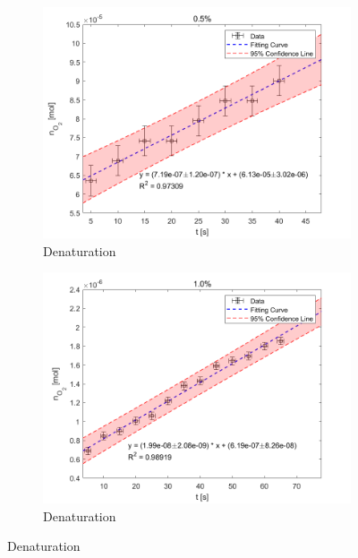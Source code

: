 \documentclass[%
 reprint,
 amsmath,amssymb,
 aps,
]{revtex4-2}
\begin{document}
\begin{figure}[htbp]
	\begin{subfigure}{0.4\textwidth}
		\includegraphics[width = 1\linewidth]{MOL_05.png}%
		\caption{\label{fig:MOL_05}Denaturation}
	\end{subfigure}
	\begin{subfigure}{0.4\textwidth}
		\includegraphics[width = 1\linewidth]{MOL_10.png}%
		\caption{\label{fig:MOL_10}Denaturation}
	\end{subfigure}


\end{figure}
\end{document}

